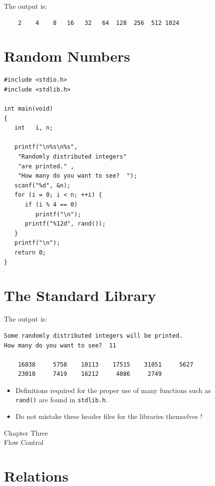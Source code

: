 \documentclass[a4,portraitt]{slides}
\begin{document}
The output is:

{\tiny
\begin{verbatim}
    2    4    8   16   32   64  128  256  512 1024
\end{verbatim}
}

\newpage
\section*{Random Numbers}

\begin{verbatim}
#include <stdio.h>
#include <stdlib.h>

int main(void)
{
   int   i, n;

   printf("\n%s\n%s",
    "Randomly distributed integers"
    "are printed." ,
    "How many do you want to see?  ");
   scanf("%d", &n);
   for (i = 0; i < n; ++i) {
      if (i % 4 == 0)
         printf("\n");
      printf("%12d", rand());
   }
   printf("\n");
   return 0;
}
\end{verbatim}

\section*{The Standard Library}


The output is:

{\tiny
\begin{verbatim}
Some randomly distributed integers will be printed.
How many do you want to see?  11

    16838     5758    10113    17515    31051     5627
    23010     7419    16212     4086     2749
\end{verbatim}
}

\begin{itemize}
\item Definitions required for the proper use of
many functions such as\\ \verb^rand()^
are found in \verb^stdlib.h^.
\item  Do not mistake these header files for the libraries
themselves !
\end{itemize}

\newpage
\begin{center}
{\Large Chapter Three \\ Flow Control}
\end{center}

\section*{Relations}
\end{document}
